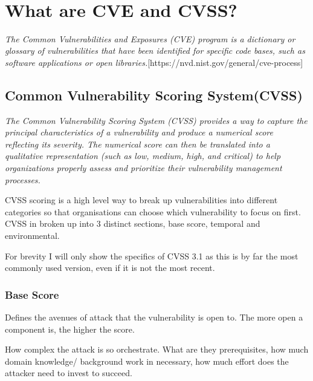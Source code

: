\documentclass[11pt]{article}
\begin{document}
 \\

\section{What are CVE and CVSS?}

\textit{The Common Vulnerabilities and Exposures (CVE) program is a dictionary or glossary of
	vulnerabilities that have been identified for specific code bases, such as software applications or
	open libraries.}[https://nvd.nist.gov/general/cve-process]

\subsection{Common Vulnerability Scoring System(CVSS)}

\textit{The Common Vulnerability Scoring System (CVSS) provides a way to capture the principal characteristics of a
	vulnerability and produce a numerical score reflecting its severity. The numerical score can then be translated
	into a qualitative representation (such as low, medium, high, and critical) to help organizations properly
	assess and prioritize their vulnerability management
	processes.}

CVSS scoring is a high level way to break up vulnerabilities into different categories so that
organisations can choose which vulnerability to focus on first. CVSS in broken up into 3 distinct sections, base score,
temporal and environmental.

For brevity I will only show the specifics of CVSS 3.1 as this is by far the most commonly used version, even if it is
not the most recent.

\subsubsection*{Base Score}


Defines the avenues of attack that the vulnerability is open to. The more open a component is, the higher the score.

How complex the attack is so orchestrate. What are they prerequisites, how much domain knowledge/ background work in necessary, how much effort does the attacker need to invest to succeed.
\end{document}

